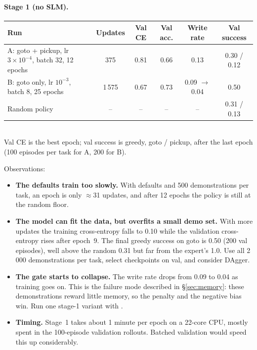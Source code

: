 \paragraph{Stage 1 (no SLM).}
\begin{center}
\small
\begin{tabularx}{\linewidth}{@{}Xccccc@{}}
\toprule
Run & Updates & Val CE & Val acc. & Write rate & Val success \\
\midrule
A: goto + pickup, lr $3\times10^{-4}$, batch 32, 12 epochs & 375 & 0.81 & 0.66 & 0.13 & 0.30 / 0.12 \\
B: goto only, lr $10^{-3}$, batch 8, 25 epochs & 1\,575 & 0.67 & 0.73 & 0.09 $\to$ 0.04 & 0.50 \\
\midrule
Random policy & -- & -- & -- & -- & 0.31 / 0.13 \\
\bottomrule
\end{tabularx}\\[2pt]
\footnotesize Val CE is the best epoch; val success is greedy, goto / pickup, after the last epoch (100 episodes per task for A, 200 for B).
\end{center}
Observations:
\begin{itemize}
  \item \textbf{The defaults train too slowly.} With  defaults and 500 demonstrations per task, an
  epoch is only $\approx$31 updates, and after 12 epochs the policy is still at the random floor.
  \item \textbf{The model can fit the data, but overfits a small demo set.} With more updates the training
  cross-entropy falls to 0.10 while the validation cross-entropy rises after epoch~9. The final greedy success on goto
  is 0.50 (200 val episodes), well above the random 0.31 but far from the expert's 1.0. Use all 2\,000 demonstrations
  per task, select checkpoints on val, and consider DAgger.
  \item \textbf{The gate starts to collapse.} The write rate drops from 0.09 to 0.04 as training goes on. This is the
  failure mode described in \S\ref{sec:memory}: these demonstrations reward little memory, so the penalty and the
  negative bias win. Run one stage-1 variant with .
  \item \textbf{Timing.} Stage~1 takes about 1 minute per epoch on a 22-core CPU, mostly spent in the 100-episode
  validation rollouts. Batched validation would speed this up considerably.
\end{itemize}
